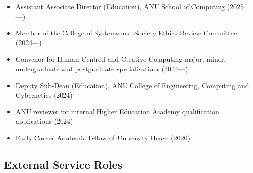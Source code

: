 \documentclass[11pt, a4paper, oneside]{article}
\begin{document}
\begin{itemize}

\item Assistant Associate Director (Education), ANU School of Computing (2025---)

\item Member of the College of Systems and Society Ethics Review Committee (2024---)

\item Convenor for Human Centred and Creative Computing major, minor, undergraduate and postgraduate specialisations (2024---)

\item Deputy Sub-Dean (Education), ANU College of Engineering, Computing and Cybernetics (2024)

\item ANU reviewer for internal Higher Education Academy qualification applications (2024)

\item Early Career Academic Fellow of University House (2020)

\end{itemize}

\subsection*{External Service Roles}
\end{document}

